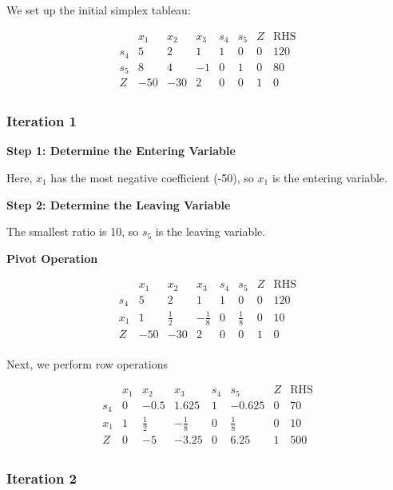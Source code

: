 \documentclass[12pt]{article}
\begin{document}
We set up the initial simplex tableau:

\[
\begin{array}{c|cccccc|c}
 & x_1 & x_2 & x_3 & s_4 & s_5 & Z & \text{RHS} \\
\hline
s_4 & 5 & 2 & 1 & 1 & 0 & 0 & 120 \\
s_5 & 8 & 4 & -1 & 0 & 1 & 0 & 80 \\
\hline
Z & -50 & -30 & 2 & 0 & 0 & 1 & 0 \\
\end{array}
\]

\subsubsection*{Iteration 1}

\textbf{Step 1: Determine the Entering Variable}

 Here, \( x_1 \) has the most negative coefficient (-50), so \( x_1 \) is the entering variable.

\textbf{Step 2: Determine the Leaving Variable}

The smallest ratio is 10, so \( s_5 \) is the leaving variable.

\textbf{Pivot Operation}

\[
\begin{array}{c|cccccc|c}
 & x_1 & x_2 & x_3 & s_4 & s_5 & Z & \text{RHS} \\
\hline
s_4 & 5 & 2 & 1 & 1 & 0 & 0 & 120 \\
x_1 & 1 & \frac{1}{2} & -\frac{1}{8} & 0 & \frac{1}{8} & 0 & 10 \\
\hline
Z & -50 & -30 & 2 & 0 & 0 & 1 & 0 \\
\end{array}
\]

Next, we perform row operations

\[
\begin{array}{c|cccccc|c}
 & x_1 & x_2 & x_3 & s_4 & s_5 & Z & \text{RHS} \\
\hline
s_4 & 0 & -0.5 & 1.625 & 1 & -0.625 & 0 & 70 \\
x_1 & 1 & \frac{1}{2} & -\frac{1}{8} & 0 & \frac{1}{8} & 0 & 10 \\
\hline
Z & 0 & -5 & -3.25 & 0 & 6.25 & 1 & 500 \\
\end{array}
\]

\subsubsection*{Iteration 2}
\end{document}
